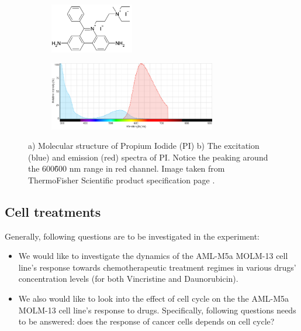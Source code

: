 \documentclass[pdftex,12pt,a4paper]{report}
\begin{document}
\begin{figure}[H]
\centering

\begin{subfigure}{\textwidth}
  \centering
  \includegraphics[width=0.4\textwidth]{images/pi}
  \caption{}
  \label{fig:pi_molecule}
\end{subfigure}%

\begin{subfigure}{\textwidth}
  \centering
  \includegraphics[width=0.8\textwidth]{images/pi_spectra}
  \caption{}
  \label{fig:pi_spectra}
\end{subfigure}%

\caption{a) Molecular structure of Propium Iodide (PI) b) The excitation (blue) and emission (red) spectra of PI. Notice the peaking around the 600\~600 nm range in red channel. Image taken from ThermoFisher Scientific product specification page \cite{thermofisher2018pi}.}

\label{fig:pi_stain}
\end{figure}

\subsection{Cell treatments}
\label{subsection:cell_treatments}

Generally, following questions are to be investigated in the experiment:

\begin{itemize}
\item We would like to investigate the dynamics of the AML-M5a MOLM-13 cell line's response towards chemotherapeutic treatment regimes in various drugs' concentration levels (for both Vincristine and Daunorubicin).
\item We also would like to look into the effect of cell cycle on the the AML-M5a MOLM-13 cell line's response to drugs. Specifically, following questions needs to be answered: does the response of cancer cells depends on cell cycle?
\end{itemize}
\end{document}
